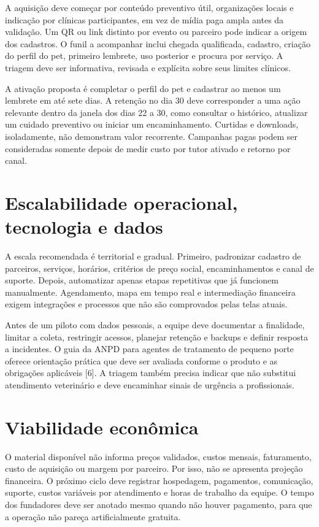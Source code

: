 \documentclass[12pt,a4paper]{article}
\begin{document}
A aquisição deve começar por conteúdo preventivo útil, organizações locais e indicação por clínicas participantes, em vez de mídia paga ampla antes da validação. Um QR ou link distinto por evento ou parceiro pode indicar a origem dos cadastros. O funil a acompanhar inclui chegada qualificada, cadastro, criação do perfil do pet, primeiro lembrete, uso posterior e procura por serviço. A triagem deve ser informativa, revisada e explícita sobre seus limites clínicos.

A ativação proposta é completar o perfil do pet e cadastrar ao menos um lembrete em até sete dias. A retenção no dia 30 deve corresponder a uma ação relevante dentro da janela dos dias 22 a 30, como consultar o histórico, atualizar um cuidado preventivo ou iniciar um encaminhamento. Curtidas e downloads, isoladamente, não demonstram valor recorrente. Campanhas pagas podem ser consideradas somente depois de medir custo por tutor ativado e retorno por canal.

\section{Escalabilidade operacional, tecnologia e dados}

A escala recomendada é territorial e gradual. Primeiro, padronizar cadastro de parceiros, serviços, horários, critérios de preço social, encaminhamentos e canal de suporte. Depois, automatizar apenas etapas repetitivas que já funcionem manualmente. Agendamento, mapa em tempo real e intermediação financeira exigem integrações e processos que não são comprovados pelas telas atuais.

Antes de um piloto com dados pessoais, a equipe deve documentar a finalidade, limitar a coleta, restringir acessos, planejar retenção e backups e definir resposta a incidentes. O guia da ANPD para agentes de tratamento de pequeno porte oferece orientação prática que deve ser avaliada conforme o produto e as obrigações aplicáveis [6]. A triagem também precisa indicar que não substitui atendimento veterinário e deve encaminhar sinais de urgência a profissionais.

\section{Viabilidade econômica}

O material disponível não informa preços validados, custos mensais, faturamento, custo de aquisição ou margem por parceiro. Por isso, não se apresenta projeção financeira. O próximo ciclo deve registrar hospedagem, pagamentos, comunicação, suporte, custos variáveis por atendimento e horas de trabalho da equipe. O tempo dos fundadores deve ser anotado mesmo quando não houver pagamento, para que a operação não pareça artificialmente gratuita.
\end{document}
